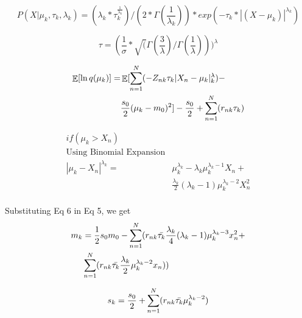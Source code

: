 \documentclass[conference]{IEEEtran}
\begin{document}
\begin{equation}
P(X|\mu_k, \tau_k, \lambda_k) = (\lambda_k * \tau_k^\frac{1}{\lambda_k})/
(2*\Gamma(\frac{1}{\lambda_k})) * exp(-\tau_k * |(X-\mu_k)|^{\lambda_k})
\end{equation}

\begin{equation}
\tau = (\frac{1}{\sigma} * \sqrt(\Gamma(\frac{3}{\lambda})/\Gamma(\frac{1}{\lambda})))^\lambda
\end{equation}

\begin{align}
\begin{split}
\mathop{\mathbb{E}}[\ln q(\mu_k)] = &\mathop{\mathbb{E}}[\sum_{\mathclap{n=1}}^{N}(-Z_{nk}\tau_k|X_n - \mu_k|^\lambda_k) - \\
&\frac{s_0}{2}(\mu_k - m_0)^2]
-\frac{s_0}{2} + \sum_{\mathclap{n=1}}^{N}(r_{nk} \tau_k)\\
\end{split}
\end{align}


\begin{equation}
    \begin{split}
        if(\mu_k > X_n )\\
        \text{Using Binomial Expansion}\\
        |\mu_k - X_n|^{\lambda_k}=&\mu_k^{\lambda_k} - \lambda_k \mu_k^{\lambda_k - 1} X_n +\\
        &\frac{\lambda_k}{2} (\lambda_k - 1) \mu_k^{\lambda_k - 2} X_n^2\\  
    \end{split}
\end{equation}

Substituting Eq 6 in Eq 5, we get
\begin{equation}
    \begin{split}
        m_k &= \frac{1}{2}s_0m_0 - \sum_{\mathclap{n=1}}^{N}(r_{nk}\bar{\tau_k}\frac{\lambda_k}{4}(\lambda_k-1)\mu_k^{\lambda_k-3} x_n^2 + \\
        &\sum_{\mathclap{n=1}}^{N}(r_{nk}\bar{\tau_k}\frac{\lambda_k}{2}\mu_k^{\lambda_k-2}x_n))\\
    \end{split}
\end{equation}

\begin{equation}
    s_k = \frac{s_0}{2} + \sum_{\mathclap{n=1}}^{N}(r_{nk}\bar{\tau_k}\mu_k^{\lambda_k-2})
\end{equation}
\end{document}
